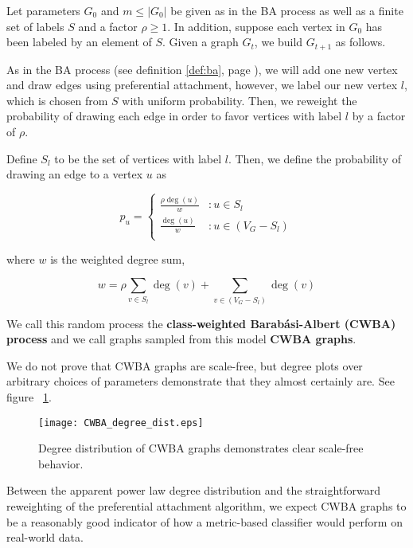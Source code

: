 \begin{definition}
  Let parameters $G_0$ and $m \leq |G_0|$ be given as in the BA process as well
  as a finite set of labels $S$ and a factor $\rho \ge 1$. In addition, suppose
  each vertex in $G_0$ has been labeled by an element of $S$. Given a graph
  $G_t$, we build $G_{t+1}$ as follows.

  As in the BA process (see definition \ref{def:ba}, page \pageref{def:ba}), we will add one new vertex and draw
  edges using preferential attachment, however, we label our new vertex $l$, which is chosen from $S$
  with uniform probability. Then, we reweight the probability of drawing each edge in order to favor
  vertices with label $l$ by a factor of $\rho$.

  Define $S_l$ to be the set of vertices with label $l$. Then, we define the
  probability of drawing an edge to a vertex $u$ as

  \[
    p_u = \begin{cases}
      \frac{\rho\deg(u)}{w} &: u \in S_l\\
      
      \frac{\deg(u)}{w} &: u \in (V_G - S_l)\\
    \end{cases}
  \]

  where $w$ is the weighted degree sum,

  \[
    w = \rho \sum_{v \in S_l}\deg(v) + \sum_{v \in (V_G - S_l)}\deg(v)
  \]

  We call this random process the \textbf{class-weighted Barab\'asi-Albert
    (CWBA) process} and we call graphs sampled from this model \textbf{CWBA
    graphs}.

\end{definition}

We do not prove that CWBA graphs are scale-free, but degree plots over arbitrary choices of
parameters demonstrate that they almost certainly are. See figure ~\ref{fig:cwba_degs}.

\begin{figure}[H]
  \centering
  \texttt{[image: CWBA\_degree\_dist.eps]}
  \caption{Degree distribution of CWBA graphs demonstrates clear scale-free behavior.}
  \label{fig:cwba_degs}
\end{figure}

Between the apparent power law degree distribution and the straightforward reweighting of the
preferential attachment algorithm, we expect CWBA graphs to be a reasonably good indicator of how a
metric-based classifier would perform on real-world data.

